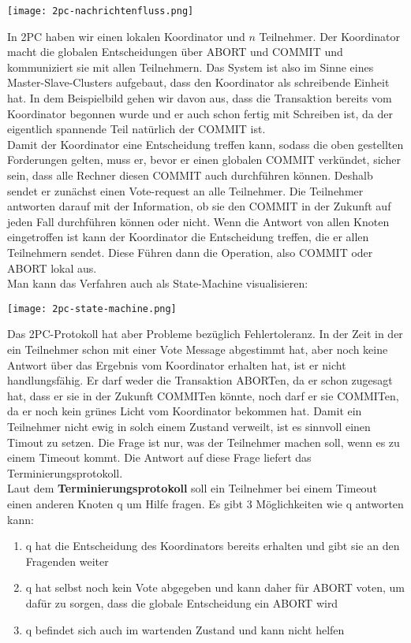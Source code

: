 \texttt{[image: 2pc-nachrichtenfluss.png]}

In 2PC haben wir einen lokalen Koordinator und $n$ Teilnehmer. Der Koordinator macht die globalen Entscheidungen über ABORT und COMMIT und kommuniziert sie mit allen Teilnehmern. Das System ist also im Sinne eines Master-Slave-Clusters aufgebaut, dass den Koordinator als schreibende Einheit hat. In dem Beispielbild gehen wir davon aus, dass die Transaktion bereits vom Koordinator begonnen wurde und er auch schon fertig mit Schreiben ist, da der eigentlich spannende Teil natürlich der COMMIT ist.\\
Damit der Koordinator eine Entscheidung treffen kann, sodass die oben gestellten Forderungen gelten, muss er, bevor er einen globalen COMMIT verkündet, sicher sein, dass alle Rechner diesen COMMIT auch durchführen können. Deshalb sendet er zunächst einen Vote-request an alle Teilnehmer. Die Teilnehmer antworten darauf mit der Information, ob sie den COMMIT in der Zukunft auf jeden Fall durchführen können oder nicht. Wenn die Antwort von allen Knoten eingetroffen ist kann der Koordinator die Entscheidung treffen, die er allen Teilnehmern sendet. Diese Führen dann die Operation, also COMMIT oder ABORT lokal aus.\\
Man kann das Verfahren auch als State-Machine visualisieren:

\texttt{[image: 2pc-state-machine.png]}

Das 2PC-Protokoll hat aber Probleme bezüglich Fehlertoleranz. In der Zeit in der ein Teilnehmer schon mit einer Vote Message abgestimmt hat, aber noch keine Antwort über das Ergebnis vom Koordinator erhalten hat, ist er nicht handlungsfähig. Er darf weder die Transaktion ABORTen, da er schon zugesagt hat, dass er sie in der Zukunft COMMITen könnte, noch darf er sie COMMITen, da er noch kein grünes Licht vom Koordinator bekommen hat. Damit ein Teilnehmer nicht ewig in solch einem Zustand verweilt, ist es sinnvoll einen Timout zu setzen. Die Frage ist nur, was der Teilnehmer machen soll, wenn es zu einem Timeout kommt. Die Antwort auf diese Frage liefert das Terminierungsprotokoll.\\
Laut dem \textbf{Terminierungsprotokoll} soll ein Teilnehmer bei einem Timeout einen anderen Knoten q um Hilfe fragen. Es gibt 3 Möglichkeiten wie q antworten kann:
\begin{enumerate}
      \item q hat die Entscheidung des Koordinators bereits erhalten und gibt sie an den Fragenden weiter
      \item q hat selbst noch kein Vote abgegeben und kann daher für ABORT voten, um dafür zu sorgen, dass die globale Entscheidung ein ABORT wird
      \item q befindet sich auch im wartenden Zustand und kann nicht helfen
\end{enumerate}

